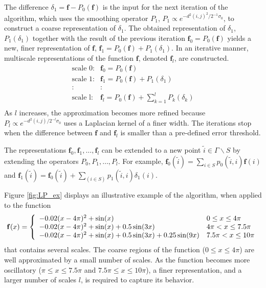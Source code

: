 \documentclass[aip,jcp,preprint]{revtex4-1}
\begin{document}
The difference $\delta_1 = \mathbf{f}-P_0(\mathbf{f})$ is the input for the next iteration of the algorithm,
which uses the smoothing operator $P_1$, $P_1 \propto e^{-d^2(i, j)^2 / 2^{-1} \sigma_0}$, to construct a coarse representation of $\delta_1$.
%
The obtained representation of $\delta_1$, $P_1(\delta_1)$ together with the result of the previous iteration $\mathbf{f}_0 = P_0(\mathbf{f})$
yields a new, finer representation of $\mathbf{f}$, $\mathbf{f}_1 = P_0(\mathbf{f}) + P_1(\delta_1)$.
%
In an iterative manner, multiscale representations of the function $\mathbf{f}$, denoted $\mathbf{f}_l$, are constructed.
\begin{equation} \label{eq:LP_multi_scale}
 \begin{array}{cl}
\mbox{scale 0:} & \mathbf{f}_0 = P_0(\mathbf{f}) \\
\mbox{scale 1:} & \mathbf{f}_1 = P_0(\mathbf{f}) + P_1(\delta_1) \\
: & : \\
\mbox{scale l:} & \mathbf{f}_l = P_0(\mathbf{f}) + \sum_{k=1}^{l}P_k(\delta_k)\\
\end{array}
\end{equation}
As $l$ increases, the approximation becomes more refined because $P_l \propto e^{-d^2(i, j) / 2^{-l} \sigma_0}$ uses a Laplacian kernel of a finer width.
%
The iterations stop when the difference between $\mathbf{f}$ and $\mathbf{f}_l$ is smaller than a pre-defined error threshold.

The representations $\mathbf{f}_0, \mathbf{f}_1, \dots, \mathbf{f}_l$ can be extended to a new point $\tilde{i} \in \Gamma \backslash S $ by extending the operators $P_0, P_1,\ldots,P_l$.
%
For example, $\mathbf{f}_0(\tilde{i}) = \sum_{i \in S} p_0(\tilde{i}, i)\mathbf{f}(i)$ and
$\mathbf{f}_1(\tilde{i}) = \mathbf{f}_0(\tilde{i}) + \sum_{(i \in S)}p_1(\tilde{i}, i)\delta_1(i)$.

\begin{widetext}
Figure \ref{fig:LP_ex} displays an illustrative example of the algorithm, when applied to the function
 \begin{equation} \label{eq:LP_example}
\mathbf{f}(x) = \left\{
\begin{array}{l l}
-0.02(x-4\pi)^2 + \sin(x) &  0 \le x \le 4\pi \\
-0.02(x-4\pi)^2 + \sin(x) + 0.5 \sin(3x) &  4\pi < x \le 7.5 \pi \\
-0.02(x-4\pi)^2 + \sin(x) + 0.5 \sin(3x) +0.25 \sin(9x) &  7.5 \pi < x \le 10 \pi
\end{array}
\right.
\end{equation}
that contains several scales.
%
The coarse regions of the function ($0 \le x \le 4\pi$) are well approximated by a small number of scales.
%
As the function becomes more oscillatory ($\pi \le x \le 7.5\pi$ and $7.5\pi \le x \le 10\pi$),
a finer representation, and a larger number of scales  $l$, is required to capture its behavior.
\end{widetext}
\end{document}

